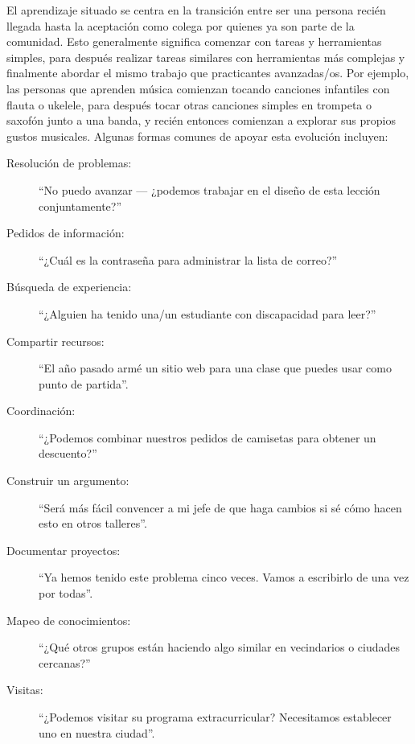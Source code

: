El aprendizaje situado se centra en la transición entre ser una persona recién llegada
hasta la aceptación como colega por quienes ya son parte de la comunidad.
Esto generalmente significa comenzar con tareas y herramientas simples,
para después realizar tareas similares con herramientas más complejas
y finalmente abordar el mismo trabajo que practicantes avanzadas/os.
Por ejemplo,
las personas que aprenden música comienzan tocando canciones infantiles con flauta o ukelele, para
después tocar otras canciones simples en trompeta o saxofón junto a una banda,
y recién entonces comienzan a explorar sus propios gustos musicales.
Algunas formas comunes de apoyar esta evolución incluyen:

\begin{description}

\item[Resolución de problemas:]
  ``No puedo avanzar --- ¿podemos trabajar en el diseño de esta lección conjuntamente?''

\item[Pedidos de información:]
  ``¿Cuál es la contraseña para administrar la lista de correo?''

\item[Búsqueda de experiencia:]
  ``¿Alguien ha tenido una/un estudiante con discapacidad para leer?''

\item[Compartir recursos:]
  ``El año pasado armé un sitio web para una clase que puedes usar como punto de partida''.
  
\item[Coordinación:]
  ``¿Podemos combinar nuestros pedidos de camisetas para obtener un descuento?''

\item[Construir un argumento:]
  ``Será más fácil convencer a mi jefe de que haga cambios si sé cómo hacen esto en otros talleres''.

\item[Documentar proyectos:]
  ``Ya hemos tenido este problema cinco veces. Vamos a escribirlo de una vez por todas''.

\item[Mapeo de conocimientos:]
  ``¿Qué otros grupos están haciendo algo similar en vecindarios o ciudades cercanas?''

\item[Visitas:]
  ``¿Podemos visitar su programa extracurricular? Necesitamos establecer uno en nuestra ciudad''.

\end{description}

